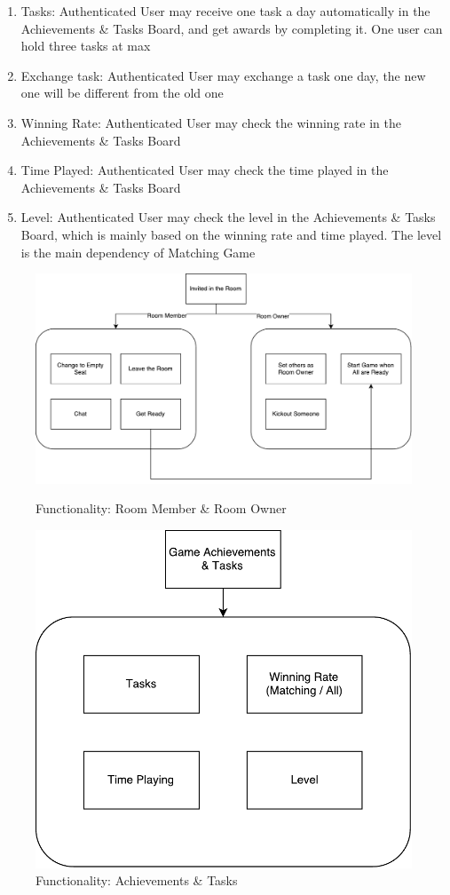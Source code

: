 \documentclass[11pt]{article}
\begin{document}
\begin{enumerate}
\item
Tasks: Authenticated User may receive one task a day automatically in the Achievements \& Tasks Board, and get awards by completing it. One user can hold three tasks at max
\item
Exchange task: Authenticated User may exchange a task one day, the new one will be different from the old one
\item
Winning Rate: Authenticated User may check the winning rate in the Achievements \& Tasks Board
\item
Time Played: Authenticated User may check the time played in the Achievements \& Tasks Board
\item
Level: Authenticated User may check the level in the Achievements \& Tasks Board, which is mainly based on the winning rate and time played. The level is the main dependency of Matching Game
\end{enumerate}

\begin{figure}
\centering
\begin{minipage}{.6\linewidth}
\centering
\includegraphics[width=.9\linewidth]{func-inroom.pdf}
\caption{Functionality: Room Member \& Room Owner}
\label{fig:func-inroom}
\end{minipage}%
\begin{minipage}{.4\linewidth}
\centering
\includegraphics[width=.9\linewidth]{func-tasks.pdf}
\caption{Functionality: Achievements \& Tasks}
\label{fig:func-tasks}
\end{minipage}
\end{figure}
\end{document}
